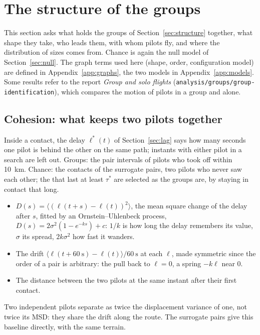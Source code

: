 \section{The structure of the groups}\label{sec:group-structure}

This section asks what holds the groups of Section~\ref{sec:structure} together, what shape they
take, who leads them, with whom pilots fly, and where the distribution of sizes comes from. Chance
is again the null model of Section~\ref{sec:null}. The graph terms used here (shape, order,
configuration model) are defined in Appendix~\ref{app:graphs}, the two models in
Appendix~\ref{app:models}. Some results refer to the report \emph{Group and solo flights}
(\texttt{analysis/groups/group-identification}), which compares the motion of pilots in a group
and alone.

\subsection{Cohesion: what keeps two pilots together}\label{sec:cohesion}

Inside a contact, the delay $\ell^*(t)$ of Section~\ref{sec:lag} says how many seconds one pilot is
behind the other on the same path; instants with either pilot in a search are left out. Groups: the
\StCohReal{} pair intervals of pilots who took off within 10~km. Chance: the \StCohChance{} contacts
of the surrogate pairs, two pilots who never saw each other; the \StCohChanceLong{} that last at
least $\tau^*$ are selected as the groups are, by staying in contact that long.
\begin{itemize}
  \item $D(s)=\langle(\ell(t+s)-\ell(t))^2\rangle$, the mean square change of the delay after $s$,
        fitted by an Ornstein--Uhlenbeck process, $D(s)=2\sigma^2(1-e^{-ks})+c$: $1/k$ is how long
        the delay remembers its value, $\sigma$ its spread, $2k\sigma^2$ how fast it wanders.
  \item The drift $\langle\ell(t+60~\mathrm{s})-\ell(t)\rangle/60~\mathrm{s}$ at each $\ell$, made
        symmetric since the order of a pair is arbitrary: the pull back to $\ell=0$, a spring $-k\ell$
        near 0.
  \item The distance between the two pilots at the same instant after their first contact.
\end{itemize}
Two independent pilots separate as twice the displacement variance of one, not twice its MSD: they
share the drift along the route. The surrogate pairs give this baseline directly, with the same
terrain.


